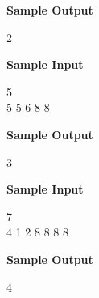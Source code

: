 \begin{flushleft}
{\color{red} \textbf{Sample Output}}
\end{flushleft}
\begin{flushleft}
2\\
\end{flushleft}

\begin{flushleft}
{\color{red} \textbf{Sample Input}}
\end{flushleft}
\begin{flushleft}
5\\
5 5 6 8 8\\
\end{flushleft}

\begin{flushleft}
{\color{red} \textbf{Sample Output}}
\end{flushleft}
\begin{flushleft}
3\\
\end{flushleft}

\begin{flushleft}
{\color{red} \textbf{Sample Input}}
\end{flushleft}
\begin{flushleft}
7\\
4 1 2 8 8 8 8\\
\end{flushleft}

\begin{flushleft}
{\color{red} \textbf{Sample Output}}
\end{flushleft}
\begin{flushleft}
4\\
\end{flushleft}

\newpage